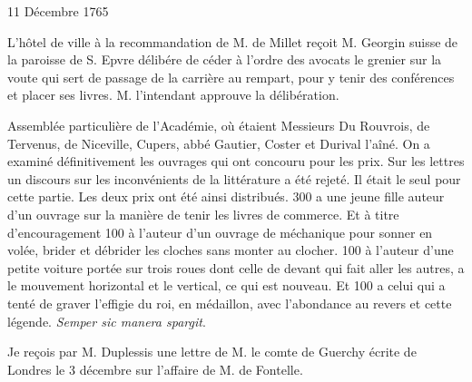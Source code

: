                      \begin{diary}{11 Décembre 1765}{}
                        
                        
                           L'hôtel de ville à la recommandation de M. de
                              Millet reçoit M. Georgin suisse de la
                              paroisse
                              de S. Epvre délibére de céder à l'ordre des
                              avocats le grenier sur la voute qui sert de
                           passage de la carrière au rempart, pour
                           y tenir des conférences et placer ses livres.
                           M. l'intendant
                           approuve la délibération. \bigskip
        
        
                         Assemblée particulière de l'Académie, où étaient Messieurs Du Rouvrois, de Tervenus, de
                              Niceville,
                           Cupers, abbé Gautier, Coster et
                              Durival l'aîné.
                           On a examiné définitivement les ouvrages
                           qui ont concouru pour les prix. Sur les
                           lettres un discours sur les inconvénients de
                              la littérature a été rejeté. Il était le seul
                           pour cette partie. Les deux prix ont été
                           ainsi distribués. 300 a une jeune fille
                           auteur d'un ouvrage sur la manière
                              de
                              tenir les livres de commerce. Et à titre
                           d'encouragement 100 à l'auteur d'un ouvrage
                              de méchanique pour sonner en volée, brider
                              et débrider les cloches sans monter au clocher.
                           100 à l'auteur d'une petite voiture portée
                           sur trois roues dont celle de devant qui
                           fait aller les autres, a le mouvement horizontal
                           et le vertical, ce qui est nouveau. Et 100 a
                           celui qui a tenté de graver l'effigie du roi,
                           en médaillon, avec l'abondance au revers
                           et cette légende. \emph{Semper sic
                              manera spargit}. \bigskip
        
        
                         Je
                           reçois par M. Duplessis une lettre
                           de
                           M. le comte de Guerchy
                           écrite de Londres
                           le 3 décembre sur l'affaire de
                              M. de Fontelle. \bigskip
        
        
                     \end{diary}

